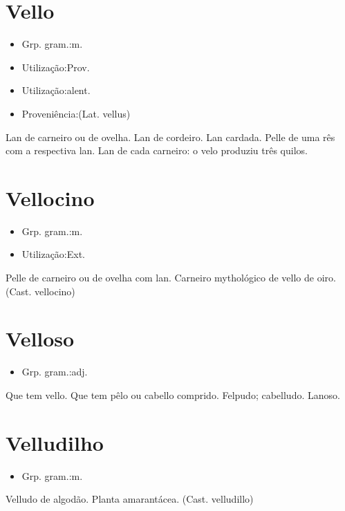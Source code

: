 \documentclass{article}
\begin{document}
\section{Vello}
\begin{itemize}
\item {Grp. gram.:m.}
\end{itemize}
\begin{itemize}
\item {Utilização:Prov.}
\end{itemize}
\begin{itemize}
\item {Utilização:alent.}
\end{itemize}
\begin{itemize}
\item {Proveniência:(Lat. \textunderscore vellus\textunderscore )}
\end{itemize}
Lan de carneiro ou de ovelha.
Lan de cordeiro.
Lan cardada.
Pelle de uma rês com a respectiva lan.
Lan de cada carneiro: \textunderscore o velo produziu três quilos\textunderscore .
\section{Vellocino}
\begin{itemize}
\item {Grp. gram.:m.}
\end{itemize}
\begin{itemize}
\item {Utilização:Ext.}
\end{itemize}
Pelle de carneiro ou de ovelha com lan.
Carneiro mythológico de vello de oiro.
(Cast. \textunderscore vellocino\textunderscore )
\section{Velloso}
\begin{itemize}
\item {Grp. gram.:adj.}
\end{itemize}
Que tem vello.
Que tem pêlo ou cabello comprido.
Felpudo; cabelludo.
Lanoso.
\section{Velludilho}
\begin{itemize}
\item {Grp. gram.:m.}
\end{itemize}
Velludo de algodão.
Planta amarantácea.
(Cast. \textunderscore velludillo\textunderscore )
\end{document}

